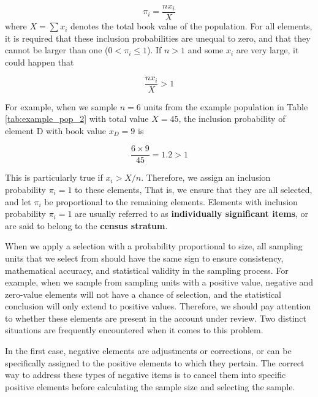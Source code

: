 \begin{equation}
\pi _i = \frac{n x_i}{X}
\label{eq:inclusion_probability}
\end{equation}
where $X = \sum{x_i}$ denotes the total book value of the population. For all elements, it is required that these inclusion probabilities are unequal to zero, and that they cannot be larger than one ($0 < \pi_i \leq 1$). If $n > 1$ and some $x_i$ are very large, it could happen that

\begin{equation*}
\frac{n x_i}{X} > 1
\end{equation*}

For example, when we sample $n = 6$ units from the example population in Table \ref{tab:example_pop_2} with total value $X = 45$, the inclusion probability of element D with book value $x_D = 9$ is

\begin{equation*}
\frac{6 \times 9}{45} = 1.2 > 1
\end{equation*}

This is particularly true if $x_i > {X} / {n}$.
Therefore, we assign an inclusion probability $\pi_i = 1$ to these elements, That is, we ensure that they are all selected, and let $\pi_i$ be proportional to the remaining elements. Elements with inclusion probability $\pi_i = 1$ are usually referred to as \textbf{individually significant items}, or are said to belong to the \textbf{census stratum}.

\bigskip
When we apply a selection with a probability proportional to size, all sampling units that we select from should have the same sign to ensure consistency, mathematical accuracy, and statistical validity in the sampling process. For example, when we sample from sampling units with a positive value, negative and zero-value elements will not have a chance of selection, and the statistical conclusion will only extend to positive values. Therefore, we should pay attention to whether these elements are present in the account under review. Two distinct situations are frequently encountered when it comes to this problem. 

In the first case, negative elements are adjustments or corrections, or can be specifically assigned to the positive elements to which they pertain. The correct way to address these types of negative items is to cancel them into specific positive elements before calculating the sample size and selecting the sample. 

